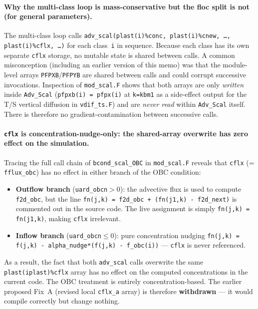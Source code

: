 \documentclass[11pt]{article}
\begin{document}
\paragraph{Why the multi-class loop is mass-conservative but the floc split
is not (for general parameters).}
The multi-class loop calls
\texttt{adv\_scal(plast(i)\%conc, plast(i)\%cnew, \ldots, plast(i)\%cflx, \ldots)}
for each class~\texttt{i} in sequence.  Because each class has its own separate
\texttt{cflx} storage, no mutable state is shared between calls.
A common misconception (including an earlier version of this memo) was that the
module-level arrays \texttt{PFPXB}/\texttt{PFPYB} are shared between calls and
could corrupt successive invocations.  Inspection of \texttt{mod\_scal.F} shows
that both arrays are only \emph{written} inside \texttt{Adv\_Scal}
(\texttt{pfpxb(i) = pfpx(i)} at \texttt{k=kbm1} as a side-effect output for
the T/S vertical diffusion in \texttt{vdif\_ts.F}) and are \emph{never read}
within \texttt{Adv\_Scal} itself.  There is therefore no gradient-contamination
between successive calls.

\paragraph{\texttt{cflx} is concentration-nudge-only: the shared-array overwrite
has zero effect on the simulation.}
Tracing the full call chain of \texttt{bcond\_scal\_OBC} in \texttt{mod\_scal.F}
reveals that \texttt{cflx} (= \texttt{fflux\_obc}) has no effect in either
branch of the OBC condition:
\begin{itemize}
  \item \textbf{Outflow branch} (\texttt{uard\_obcn}$>0$): the advective flux
        is used to compute \texttt{f2d\_obc}, but the line
        \texttt{fn(j,k) = f2d\_obc + (fn(j1,k) - f2d\_next)} is commented out
        in the source code.  The live assignment is simply
        \texttt{fn(j,k) = fn(j1,k)}, making \texttt{cflx} irrelevant.
  \item \textbf{Inflow branch} (\texttt{uard\_obcn}$\leq 0$): pure
        concentration nudging \texttt{fn(j,k) = f(j,k) - alpha\_nudge*(f(j,k) - f\_obc(i))}
        --- \texttt{cflx} is never referenced.
\end{itemize}
As a result, the fact that both \texttt{adv\_scal} calls overwrite the same
\texttt{plast(iplast)\%cflx} array has no effect on the computed concentrations
in the current code.  The OBC treatment is entirely concentration-based.
The earlier proposed Fix~A (revised local \texttt{cflx\_a} array) is therefore
\textbf{withdrawn} --- it would compile correctly but change nothing.
\end{document}
